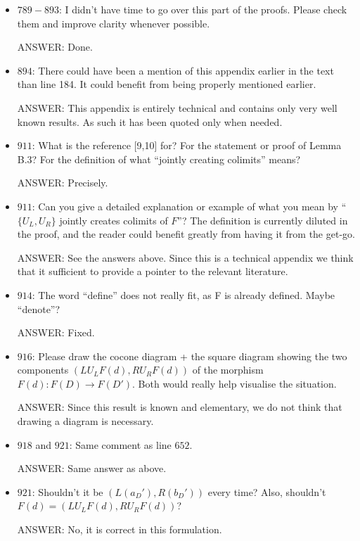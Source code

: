 \documentclass[english,11pt,a4paper]{article}
\begin{document}
\begin{itemize}
\item $789-893$: I didn't have time to go over this part of the proofs. Please check them and improve clarity whenever possible.

ANSWER: Done.

\item $894$: There could have been a mention of this appendix earlier in the text than line 184. It could benefit from being properly mentioned earlier.

ANSWER: This appendix is entirely technical and contains only very well known results. As such it has been quoted only when needed.

\item $911$: What is the reference [9,10] for? For the statement or proof of Lemma B.3? For the definition of what ``jointly creating colimits'' means?

ANSWER: Precisely.

\item $911$: Can you give a detailed explanation or example of what you mean by ``$\{U_L, U_R\}$ jointly creates colimits of $F$''? The definition is currently diluted in the proof, and the reader could benefit greatly from having it from the get-go.

ANSWER: See the answers above. Since this is a technical appendix we think that it sufficient to provide a pointer to the relevant literature.

\item $914$: The word ``define'' does not really fit, as F is already defined. Maybe ``denote''?

ANSWER: Fixed.

\item $916$: Please draw the cocone diagram + the square diagram showing the two components $(LU_LF(d),RU_RF(d))$ of the morphism $F(d):F(D) \to F(D')$. Both would really help visualise the situation.

ANSWER: Since this result is known and elementary, we do not think that drawing a diagram is necessary.

\item $918$ and $921$: Same comment as line $652$.

ANSWER: Same answer as above.

\item $921$: Shouldn't it be $(L(a_D'),R(b_D'))$ every time? Also, shouldn't $F(d) = (LU_LF(d),RU_RF(d))$?

ANSWER:  No, it is correct in this formulation.


\end{itemize}
\end{document}

